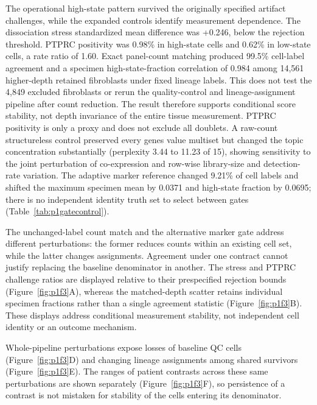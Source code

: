\documentclass[10pt,a4paper]{article}
\begin{document}
The operational high-state pattern survived the originally specified artifact challenges, while the expanded controls identify measurement dependence. The dissociation stress standardized mean difference was +0.246, below the rejection threshold. PTPRC positivity was 0.98\% in high-state cells and 0.62\% in low-state cells, a rate ratio of 1.60. Exact panel-count matching produced 99.5\% cell-label agreement and a specimen high-state-fraction correlation of 0.984 among 14,561 higher-depth retained fibroblasts under fixed lineage labels. This does not test the 4,849 excluded fibroblasts or rerun the quality-control and lineage-assignment pipeline after count reduction. The result therefore supports conditional score stability, not depth invariance of the entire tissue measurement. PTPRC positivity is only a proxy and does not exclude all doublets. A raw-count structureless control preserved every gene\textquotesingle{}s value multiset but changed the topic concentration substantially (perplexity 3.44 to 11.23 of 15), showing sensitivity to the joint perturbation of co-expression and row-wise library-size and detection-rate variation. The adaptive marker reference changed 9.21\% of cell labels and shifted the maximum specimen mean by 0.0371 and high-state fraction by 0.0695; there is no independent identity truth set to select between gates (Table~\ref{tab:p1gatecontrol}).

The unchanged-label count match and the alternative marker gate address different perturbations: the former reduces counts within an existing cell set, while the latter changes assignments. Agreement under one contract cannot justify replacing the baseline denominator in another. 
\FloatBarrier
The stress and PTPRC challenge ratios are displayed relative to their prespecified rejection bounds (Figure~\ref{fig:p1f3}A\label{call:p1f3}), whereas the matched-depth scatter retains individual specimen fractions rather than a single agreement statistic (Figure~\ref{fig:p1f3}B). These displays address conditional measurement stability, not independent cell identity or an outcome mechanism.




Whole-pipeline perturbations expose losses of baseline QC cells (Figure~\ref{fig:p1f3}D) and changing lineage assignments among shared survivors (Figure~\ref{fig:p1f3}E). The ranges of patient contrasts across these same perturbations are shown separately (Figure~\ref{fig:p1f3}F), so persistence of a contrast is not mistaken for stability of the cells entering its denominator.
\end{document}

